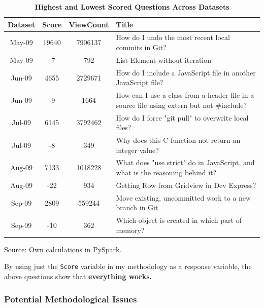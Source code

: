 \documentclass[11pt,preprint, authoryear]{article}
\numberwithin{equation}{section}
\begin{document}
\begin{longtable} {@{} cccp{11cm} @{}}
\caption{\textbf{Highest and Lowest Scored Questions Across Datasets}}
\label{tab:bestworst}\\ 
\toprule
\textbf{Dataset} & \textbf{Score} & \textbf{ViewCount} & \textbf{Title} \\ 
\midrule
May-09 &  19640 &    7906137 &  How do I undo the most recent local commits in Git? \\
May-09 &     -7 &        792 &                       List Element without iteration \\
Jun-09 &   4655 &    2729671 &                            How do I include a JavaScript file in another JavaScript file? \\
Jun-09 &     -9 &       1664 &  How can I use a class from a header file in a source file using extern but not \#include? \\
Jul-09 &   6145 &    3792462 &    How do I force "git pull" to overwrite local files? \\
Jul-09 &     -8 &        349 &  Why does this C function not return an integer value? \\
Aug-09 &   7133 &    1018228 &  What does "use strict" do in JavaScript, and what is the reasoning behind it? \\
Aug-09 &    -22 &        934 &                                      Getting Row from Gridview in Dev Express? \\
Sep-09 &   2809 &     559244 &  Move existing, uncommitted work to a new branch in Git \\
Sep-09 &    -10 &        362 &        Which object is created in which part of memory? \\
\bottomrule
\end{longtable}\begin{center} Source: Own calculations in PySpark.\end{center}

\normalsize

By using just the \texttt{Score} variable in my methodology as a
response variable, the above questions show that \textbf{everything
works.}

\subsubsection{\texorpdfstring{Potential Methodological Issues
\label{Issues}}{Potential Methodological Issues }}\label{potential-methodological-issues}
\end{document}
